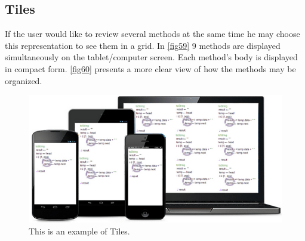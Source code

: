 \subsection{Tiles}
If the user would like to review several methods at the same time he may choose this representation to see them in a grid. In \autoref{fig59} 9 methods are displayed simultaneously on the tablet/computer screen. Each method's body is displayed in compact form. \autoref{fig60} presents a more clear view of how the methods may be organized.
\begin{figure}[H]
	\includegraphics{"./fig/Tiles"}
	\caption{This is an example of Tiles.}
	\label{fig59}
\end{figure}
